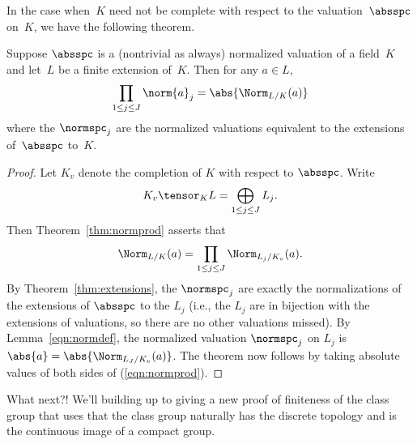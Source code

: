 In the case when~$K$ need not be complete with respect
to the valuation~$\absspc$ on~$K$, we have the following
theorem.
\begin{theorem}\label{thm:normprod}
Suppose $\absspc$ is a (nontrivial as always) normalized valuation
of a field~$K$ and let~$L$ be a finite extension of~$K$.
Then for any $a\in L$,
$$  
   \prod_{1\leq j \leq J} \norm{a}_j = \abs{\Norm_{L/K}(a)}
$$
where the $\normspc_j$ are the normalized valuations equivalent
to the extensions of~$\absspc$ to~$K$.
\end{theorem}
\begin{proof}
Let $K_v$ denote the completion of $K$ with respect to 
$\absspc$.  Write
$$
  K_v\tensor_K L = \bigoplus_{1\leq j \leq J} L_j.
$$
Then Theorem~\ref{thm:normprod} asserts that
\begin{equation}\label{eqn:normprod}
 \Norm_{L/K}(a) = \prod_{1\leq j\leq J} \Norm_{L_j/K_v}(a).
\end{equation}
By Theorem~\ref{thm:extensions}, the $\normspc_j$ are exactly the
normalizations of the extensions of $\absspc$ to the $L_j$ (i.e., the
$L_j$ are in bijection with the extensions of valuations, so there are
no other valuations missed).  By Lemma~\ref{eqn:normdef}, the
normalized valuation $\normspc_j$ on $L_j$ is $\abs{a} =
\abs{\Norm_{L_J/K_v}(a)}$.  The theorem now follows by taking absolute
values of both sides of (\ref{eqn:normprod}).
\end{proof}

What next?!  We'll building up to giving a new proof of finiteness of
the class group that uses that the class group naturally has the
discrete topology and is the continuous image of a compact group.


